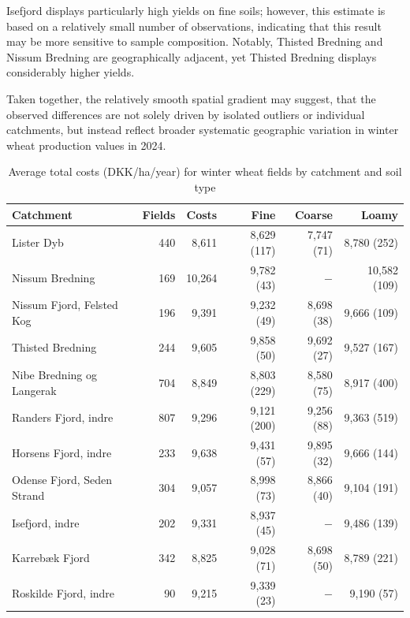 \documentclass[12pt]{article}
\begin{document}
Isefjord displays particularly high yields on fine soils; however, this estimate is based on a relatively small number of observations, indicating that this result may be more sensitive to sample composition. Notably, Thisted Bredning and Nissum Bredning are geographically adjacent, yet Thisted Bredning displays considerably higher yields. 

Taken together, the relatively smooth spatial gradient may suggest, that the observed differences are not solely driven by isolated outliers or individual catchments, but instead reflect broader systematic geographic variation in winter wheat production values in 2024.

\begin{table}[H]
\centering
\small
\caption{Average total costs (DKK/ha/year) for winter wheat fields by catchment and soil type}
\label{tab:costs-vinterhvede}
\begin{threeparttable}
\begin{tabular}{lrrrrr}
\toprule
\textbf{Catchment} & \textbf{Fields} & \textbf{Costs} & \textbf{Fine} &
\textbf{Coarse} & \textbf{Loamy} \\
\midrule\addlinespace
Lister Dyb                 & 440 & 8,611  & 8,629 (117)  & 7,747 (71)   & 8,780 (252) \\
Nissum Bredning            & 169 & 10,264 & 9,782 (43)   & $-$           & 10,582 (109) \\
Nissum Fjord, Felsted Kog  & 196 & 9,391  & 9,232 (49)   & 8,698 (38)   & 9,666 (109) \\
Thisted Bredning           & 244 & 9,605  & 9,858 (50)   & 9,692 (27)   & 9,527 (167) \\
Nibe Bredning og Langerak  & 704 & 8,849  & 8,803 (229)  & 8,580 (75)   & 8,917 (400) \\
Randers Fjord, indre       & 807 & 9,296  & 9,121 (200)  & 9,256 (88)   & 9,363 (519) \\
Horsens Fjord, indre       & 233 & 9,638  & 9,431 (57)   & 9,895 (32)   & 9,666 (144) \\
Odense Fjord, Seden Strand & 304 & 9,057  & 8,998 (73)   & 8,866 (40)   & 9,104 (191) \\
Isefjord, indre            & 202 & 9,331  & 8,937 (45)   & $-$           & 9,486 (139) \\
Karrebæk Fjord             & 342 & 8,825  & 9,028 (71)   & 8,698 (50)   & 8,789 (221) \\
Roskilde Fjord, indre      &  90 & 9,215  & 9,339 (23)   & $-$           & 9,190 (57) \\

\end{tabular}
\end{threeparttable}
\end{table}
\end{document}
